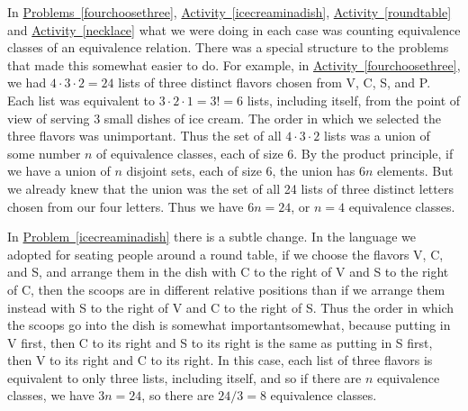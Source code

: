 \documentclass[10pt,]{book}
\theoremstyle{plain}
\theoremstyle{definition}
\numberwithin{equation}{chapter}
\begin{document}
In \hyperref[fourchoosethree]{Problems~\ref{fourchoosethree}}, \hyperref[icecreaminadish]{Activity~\ref{icecreaminadish}}, \hyperref[roundtable]{Activity~\ref{roundtable}} and \hyperref[necklace]{Activity~\ref{necklace}} what we were doing in each case was counting equivalence classes of an equivalence relation. There was a special structure to the problems that made this somewhat easier to do. For example, in \hyperref[fourchoosethree]{Activity~\ref{fourchoosethree}}, we had \(4\cdot3\cdot2 =24\) lists of three distinct flavors chosen from V, C, S, and P. Each list was equivalent to \(3\cdot2\cdot1=3!=6\) lists, including itself, from the point of view of serving 3 small dishes of ice cream. The order in which we selected the three flavors was unimportant. Thus the set of all \(4\cdot3\cdot2\) lists was a union of some number \(n\) of equivalence classes, each of size 6. By the product principle, if we have a union of \(n\) disjoint sets, each of size 6, the union has \(6n\) elements. But we already knew that the union was the set of all 24 lists of three distinct letters chosen from our four letters. Thus we have \(6n=24\), or \(n=4\) equivalence classes.%
\par
In \hyperref[icecreaminadish]{Problem~\ref{icecreaminadish}} there is a subtle change. In the language we adopted for seating people around a round table, if we choose the flavors V, C, and S, and arrange them in the dish with C to the right of V and S to the right of C, then the scoops are in different relative positions than if we arrange them instead with S to the right of V and C to the right of S. Thus the order in which the scoops go into the dish is somewhat important\textemdash{}somewhat, because putting in V first, then C to its right and S to its right is the same as putting in S first, then V to its right and C to its right. In this case, each list of three flavors is equivalent to only three lists, including itself, and so if there are \(n\) equivalence classes, we have \(3n=24\), so there are \(24/3=8\) equivalence classes.%
\end{document}
